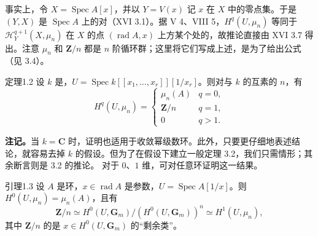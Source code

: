事实上，令 $X=\operatorname{Spec}A[x]$，并以 $Y=V(x)$ 记 $x$ 在 $X$ 中的零点集。于是 $(Y,X)$ 是 $\operatorname{Spec}A$ 上的对（XVI 3.1）。据 V 4、VIII 5，$H^q(U,\mu_n)$ 等同于 $\mathcal H_Y^{q+1}(X,\mu_n)$ 在 $X$ 的点 $(\operatorname{rad}A,x)$ 上方某个处的，故推论直接由 XVI 3.7 得出。注意 $\mu_n$ 和 $\mathbf Z/n$ 都是 $n$ 阶循环群；这里将它们写成上述，是为了给出公式（见 3.4）。
\begin{SGAresult}{定理}{1.2}
设 $k$ 是，$U=\operatorname{Spec}k[[x_1,\ldots,x_r]][1/x_r]$。则对与 $k$ 的互素的 $n$，有
\[H^q(U,\mu_n)=\begin{cases}\mu_n(A)&q=0,\\\mathbf Z/n&q=1,\\0&q>1.\end{cases}\]
\end{SGAresult}
\textbf{注记。}当 $k=\mathbf C$ 时，证明也适用于收敛幂级数环。此外，只要更仔细地表述结论，就容易去掉 $k$ 的假设。但为了在假设下建立一般定理 3.2，我们只需情形；其余断言则是 3.2 的推论。
对于 $0$、$1$ 维，可对任意环证明这一结果。
\begin{SGAresult}{引理}{1.3}
设 $A$ 是环，$x\in\operatorname{rad}A$ 是参数，$U=\operatorname{Spec}A[1/x]$。则 $H^0(U,\mu_n)=\mu_n(A)$，且有
\[\mathbf Z/n\simeq H^0(U,\mathbf G_m)/(H^0(U,\mathbf G_m))^n\simeq H^1(U,\mu_n),\]
其中 $\mathbf Z/n$ 的是 $x\in H^0(U,\mathbf G_m)$ 的“剩余类”。
\end{SGAresult}
